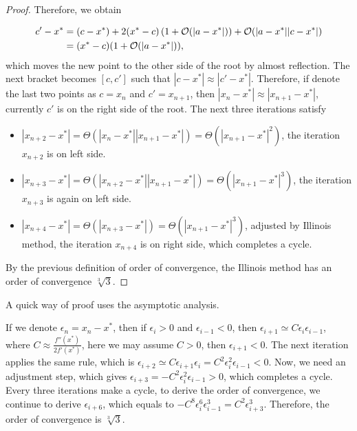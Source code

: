 \begin{proof}
Therefore, we obtain

$$
\begin{aligned}
c' - x^{\ast} &= (c- x^{\ast}) + 2(x^{\ast} - c)\left(1 + \mathcal O(|a - x^{\ast}|)\right) + \mathcal O(|a - x^{\ast}||c - x^{\ast}|) \\
&= (x^{\ast} - c)(1 + \mathcal O(|a - x^{\ast}|)),
\end{aligned}
$$
which moves the new point to the other side of the root by almost reflection. The next bracket becomes $[c, c']$ such that $|c - x^{\ast}|\approx |c' - x^{\ast}|$. Therefore, if denote the last two points as $c = x_{n}$ and $c'=x_{n+1}$, then $|x_{n} - x^{\ast}|\approx |x_{n+1} - x^{\ast}|$, currently $c'$ is on the right side of the root. The next three iterations satisfy

\begin{itemize}
    \item  $|x_{n+2} - x^{\ast}| = \Theta(|x_n - x^{\ast}| |x_{n+1} - x^{\ast}|) = \Theta(|x_{n+1} - x^{\ast}|^2) $, the iteration $x_{n+2}$ is on left side.
    \item  $|x_{n+3} - x^{\ast}| = \Theta(|x_{n+2} - x^{\ast}||x_{n+1} - x^{\ast}|) = \Theta(|x_{n+1} - x^{\ast}|^3)$, the iteration $x_{n+3}$ is again on left side.
    \item  $|x_{n+4} - x^{\ast}| = \Theta(|x_{n+3} - x^{\ast}|) = \Theta(|x_{n+1} - x^{\ast}|^3)$, adjusted by Illinois method, the iteration $x_{n+4}$ is on right side, which completes a cycle.
\end{itemize}

By the previous definition of order of convergence, the Illinois method has an order of convergence $\sqrt[3]{3}$.
\end{proof}

\begin{remark}
\label{REM: 0-CO-IL-AS}
A quick way of proof uses the asymptotic analysis. 

If we denote $\epsilon_{n} =x_n - x^{\ast}$, then if $\epsilon_{i} > 0$ and $\epsilon_{i-1} < 0$, then $\epsilon_{i+1} \simeq C \epsilon_{i}\epsilon_{i-1}$, where $C\approx \frac{f''(x^{\ast})}{2f'(x^{\ast})}$, here we may assume $C > 0$, then $\epsilon_{i+1} < 0$.  The next iteration applies the same rule, which is $\epsilon_{i+2} \simeq C \epsilon_{i+1}\epsilon_{i} = C^2 \epsilon_i^2 \epsilon_{i-1} < 0$.  Now, we need an adjustment step, which gives $\epsilon_{i+3} = -C^2 \epsilon_i^2 \epsilon_{i-1} > 0$, which completes a cycle. Every three iterations make a cycle, to derive the order of convergence, we continue to derive $\epsilon_{i+6}$, which equals to $-C^8\epsilon_{i}^6\epsilon_{i-1}^3 = C^2\epsilon_{i+3}^3$. Therefore, the order of convergence is $\sqrt[3]{3}$.
\end{remark}

